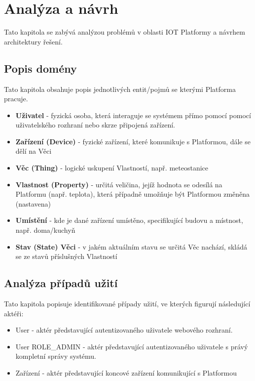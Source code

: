 
\chapter{Analýza a návrh}
Tato kapitola se zabývá analýzou problémů v oblasti IOT Platformy a návrhem architektury řešení.

\section{Popis domény} %
Tato kapitola obsahuje popis jednotlivých entit/pojmů se kterými Platforma pracuje.
\begin{itemize}
    \item \textbf{Uživatel} - fyzická osoba, která interaguje se systémem přímo pomocí pomocí uživatelského rozhraní nebo skrze připojená zařízení.
    \item \textbf{Zařízení (Device)} - fyzické zařízení, které komunikuje s Platformou, dále se dělí na Věci
    \item \textbf{Věc (Thing)} - logické uskupení Vlastností, např. meteostanice
    \item \textbf{Vlastnost (Property)} - určitá veličina, jejíž hodnota se odesílá na Platformu (např. teplota), která případně umožňuje být Platformou změněna (nastavena)
    \item \textbf{Umístění} - kde je dané zařízení umístěno, specifikující budovu a místnost, např. doma/kuchyň
    \item \textbf{Stav (State) Věci} - v jakém aktuálním stavu se určitá Věc nachází, skládá se ze stavů příslušných Vlastností
\end{itemize}


\section{Analýza případů užití}
Tato kapitola popisuje identifikované případy užití, ve kterých figurují následující aktéři:
\begin{itemize}
    \item User - aktér představující autentizovaného uživatele webového rozhraní.
    \item User ROLE\_ADMIN - aktér představující autentizovaného uživatele s právý kompletní správy systému.
    \item Zařízení - aktér představující koncové zařízení komunikující s Platformou
\end{itemize}

